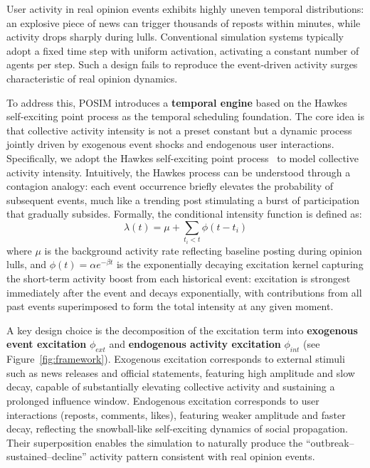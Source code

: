 \documentclass[a4paper,fleqn]{cas-dc}
\begin{document}
User activity in real opinion events exhibits highly uneven temporal distributions: an explosive piece of news can trigger thousands of reposts within minutes, while activity drops sharply during lulls. Conventional simulation systems typically adopt a fixed time step with uniform activation, activating a constant number of agents per step. Such a design fails to reproduce the event-driven activity surges characteristic of real opinion dynamics.

To address this, POSIM introduces a \textbf{temporal engine} based on the Hawkes self-exciting point process as the temporal scheduling foundation. The core idea is that collective activity intensity is not a preset constant but a dynamic process jointly driven by exogenous event shocks and endogenous user interactions. Specifically, we adopt the Hawkes self-exciting point process~\citep{hawkes_spectra_1971} to model collective activity intensity. Intuitively, the Hawkes process can be understood through a contagion analogy: each event occurrence briefly elevates the probability of subsequent events, much like a trending post stimulating a burst of participation that gradually subsides. Formally, the conditional intensity function is defined as:
\begin{equation}
\lambda(t) = \mu + \sum_{t_i < t} \phi(t - t_i)
\label{eq:hawkes}
\end{equation}
where $\mu$ is the background activity rate reflecting baseline posting during opinion lulls, and $\phi(t) = \alpha e^{-\beta t}$ is the exponentially decaying excitation kernel capturing the short-term activity boost from each historical event: excitation is strongest immediately after the event and decays exponentially, with contributions from all past events superimposed to form the total intensity at any given moment.

A key design choice is the decomposition of the excitation term into \textbf{exogenous event excitation} $\phi_{ext}$ and \textbf{endogenous activity excitation} $\phi_{int}$ (see Figure~\ref{fig:framework}). Exogenous excitation corresponds to external stimuli such as news releases and official statements, featuring high amplitude and slow decay, capable of substantially elevating collective activity and sustaining a prolonged influence window. Endogenous excitation corresponds to user interactions (reposts, comments, likes), featuring weaker amplitude and faster decay, reflecting the snowball-like self-exciting dynamics of social propagation. Their superposition enables the simulation to naturally produce the ``outbreak--sustained--decline'' activity pattern consistent with real opinion events.
\end{document}
